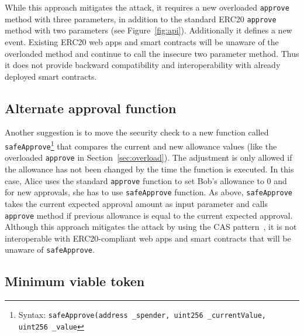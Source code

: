 While this approach mitigates the attack, it requires a new overloaded \texttt{approve} method with three parameters, in addition to the standard ERC20 \texttt{approve} method with two parameters (see Figure~\ref{fig:api}). Additionally it defines a new event. Existing ERC20 web apps and smart contracts will be unaware of the overloaded method and continue to call the insecure two parameter method. Thus it does not provide backward compatibility and interoperability with already deployed smart contracts. 




\subsection{Alternate approval function}

Another suggestion \cite{Ref16} is to move the security check to a new function called \texttt{safeApprove}\footnote{Syntax: \texttt{safeApprove(address \_spender, uint256 \_currentValue, uint256 \_value}} that compares the current and new allowance values (like the overloaded \texttt{approve} in Section~\ref{sec:overload}). The adjustment is only allowed if the allowance has not been changed by the time the function is executed. In this case, Alice uses the standard \texttt{approve} function to set Bob’s allowance to 0 and for new approvals, she has to use \texttt{safeApprove} function. As above, \texttt{safeApprove} takes the current expected approval amount as input parameter and calls \texttt{approve} method if previous allowance is equal to the current expected approval. Although this approach mitigates the attack by using the CAS pattern~\cite{Ref06}, it is not interoperable with ERC20-compliant web apps and smart contracts that will be unaware of \texttt{safeApprove}.


\subsection{Minimum viable token}

